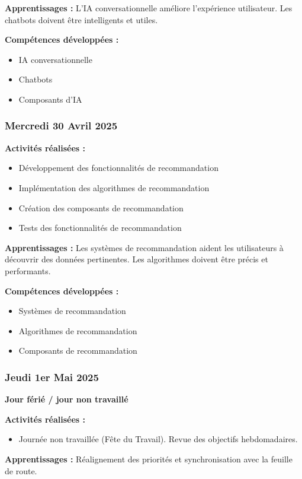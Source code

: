 \documentclass[12pt,a4paper]{article}
\begin{document}
\textbf{Apprentissages :}
L'IA conversationnelle améliore l'expérience utilisateur. Les chatbots doivent être intelligents et utiles.

\textbf{Compétences développées :}
\begin{itemize}
    \item IA conversationnelle
    \item Chatbots
    \item Composants d'IA
\end{itemize}

\subsubsection{Mercredi 30 Avril 2025}
\textbf{Activités réalisées :}
\begin{itemize}
    \item Développement des fonctionnalités de recommandation
    \item Implémentation des algorithmes de recommandation
    \item Création des composants de recommandation
    \item Tests des fonctionnalités de recommandation
\end{itemize}

\textbf{Apprentissages :}
Les systèmes de recommandation aident les utilisateurs à découvrir des données pertinentes. Les algorithmes doivent être précis et performants.

\textbf{Compétences développées :}
\begin{itemize}
    \item Systèmes de recommandation
    \item Algorithmes de recommandation
    \item Composants de recommandation
\end{itemize}

\subsubsection{Jeudi 1er Mai 2025}
\textbf{Jour férié / jour non travaillé}

\textbf{Activités réalisées :}
\begin{itemize}
    \item Journée non travaillée (Fête du Travail). Revue des objectifs hebdomadaires.
\end{itemize}

\textbf{Apprentissages :}
Réalignement des priorités et synchronisation avec la feuille de route.
\end{document}

